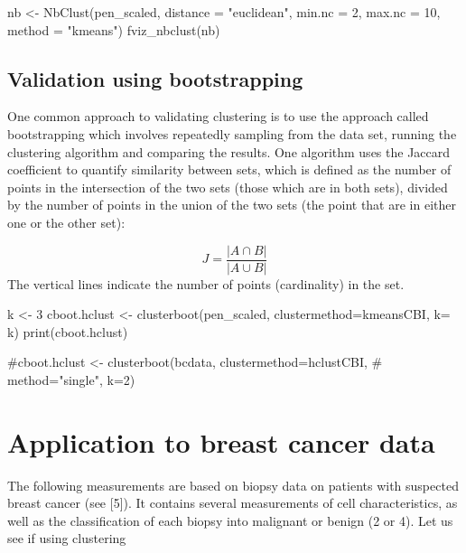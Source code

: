\documentclass[
  letterpaper,
  DIV=11,
  numbers=noendperiod]{scrreprt}
\newenvironment{Shaded}{\begin{snugshade}}{\end{snugshade}}
\newcommand{\NormalTok}[1]{\textcolor[rgb]{0.00,0.23,0.31}{#1}}
\begin{document}
\begin{Shaded}
\begin{Highlighting}[]
\NormalTok{nb \textless{}{-} NbClust(pen\_scaled, distance = "euclidean", min.nc = 2,}
\NormalTok{        max.nc = 10, method = "kmeans")}
\NormalTok{fviz\_nbclust(nb)}
\end{Highlighting}
\end{Shaded}

\subsection{Validation using
bootstrapping}\label{validation-using-bootstrapping}

One common approach to validating clustering is to use the approach
called bootstrapping which involves repeatedly sampling from the data
set, running the clustering algorithm and comparing the results. One
algorithm uses the Jaccard coefficient to quantify similarity between
sets, which is defined as the number of points in the intersection of
the two sets (those which are in both sets), divided by the number of
points in the union of the two sets (the point that are in either one or
the other set):

\[
J = \frac{ \vert A \cap B \vert }{\vert A \cup B \vert}
\] The vertical lines indicate the number of points (cardinality) in the
set.

\begin{Shaded}
\begin{Highlighting}[]
\NormalTok{k \textless{}{-} 3}
\NormalTok{cboot.hclust \textless{}{-} clusterboot(pen\_scaled, clustermethod=kmeansCBI, k= k)}
\NormalTok{print(cboot.hclust)}

\NormalTok{\#cboot.hclust \textless{}{-} clusterboot(bcdata, clustermethod=hclustCBI,}
\NormalTok{       \#                    method="single", k=2)}
\end{Highlighting}
\end{Shaded}

\section{Application to breast cancer
data}\label{application-to-breast-cancer-data}

The following measurements are based on biopsy data on patients with
suspected breast cancer (see {[}5{]}). It contains several measurements
of cell characteristics, as well as the classification of each biopsy
into malignant or benign (2 or 4). Let us see if using clustering
\end{document}
